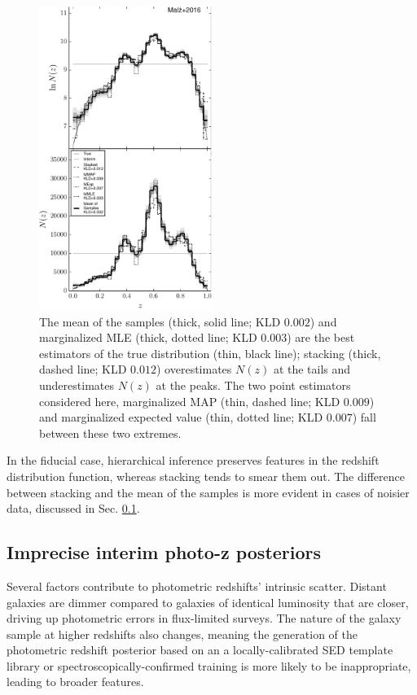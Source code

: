 \documentclass[preprint]{aastex}
\begin{document}
\begin{figure}
\includegraphics[width=0.5\textwidth]{figs/null/comps.pdf}
\caption{The mean of the samples (thick, solid line; KLD $0.002$) and 
marginalized MLE (thick, dotted line; KLD $0.003$) are the best estimators of 
the true distribution (thin, black line); stacking (thick, dashed line; KLD 
$0.012$) overestimates $N(z)$ at the tails and underestimates $N(z)$ at the 
peaks.  The two point estimators considered here, marginalized MAP (thin, 
dashed line; KLD $0.009$) and marginalized expected value (thin, dotted line; 
KLD $0.007$) fall between these two extremes.}
\label{fig:null-comp}
\end{figure}

In the fiducial case, hierarchical inference preserves features in the redshift 
distribution function, whereas stacking tends to smear them out.  The 
difference between stacking and the mean of the samples is more evident in 
cases of noisier data, discussed in Sec. \ref{sec:noisy}.

\clearpage
\subsection{Imprecise interim photo-z posteriors}
\label{sec:noisy}

Several factors contribute to photometric redshifts' intrinsic scatter.  
Distant galaxies are dimmer compared to galaxies of identical luminosity that 
are closer, driving up photometric errors in flux-limited surveys.  The nature 
of the galaxy sample at higher redshifts also changes, meaning the generation 
of the photometric redshift posterior based on an a locally-calibrated SED 
template library or spectroscopically-confirmed training is more likely to be 
inappropriate, leading to broader features.
\end{document}

